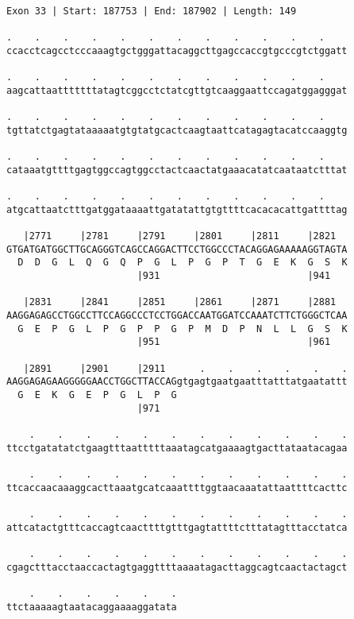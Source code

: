 \documentclass{article}
\begin{document}
\begin{Verbatim}[fontfamily=courier]
Exon 33 | Start: 187753 | End: 187902 | Length: 149

.    .    .    .    .    .    .    .    .    .    .    .    
ccacctcagcctcccaaagtgctgggattacaggcttgagccaccgtgcccgtctggatt

.    .    .    .    .    .    .    .    .    .    .    .    
aagcattaatttttttatagtcggcctctatcgttgtcaaggaattccagatggagggat

.    .    .    .    .    .    .    .    .    .    .    .    
tgttatctgagtataaaaatgtgtatgcactcaagtaattcatagagtacatccaaggtg

.    .    .    .    .    .    .    .    .    .    .    .    
cataaatgttttgagtggccagtggcctactcaactatgaaacatatcaataatctttat

.    .    .    .    .    .    .    .    .    .    .    .    
atgcattaatctttgatggataaaattgatatattgtgttttcacacacattgattttag

   |2771     |2781     |2791     |2801     |2811     |2821  
GTGATGATGGCTTGCAGGGTCAGCCAGGACTTCCTGGCCCTACAGGAGAAAAAGGTAGTA
  D  D  G  L  Q  G  Q  P  G  L  P  G  P  T  G  E  K  G  S  K
                       |931                          |941   

   |2831     |2841     |2851     |2861     |2871     |2881  
AAGGAGAGCCTGGCCTTCCAGGCCCTCCTGGACCAATGGATCCAAATCTTCTGGGCTCAA
  G  E  P  G  L  P  G  P  P  G  P  M  D  P  N  L  L  G  S  K
                       |951                          |961   

   |2891     |2901     |2911      .    .    .    .    .    .
AAGGAGAGAAGGGGGAACCTGGCTTACCAGgtgagtgaatgaatttatttatgaatattt
  G  E  K  G  E  P  G  L  P  G                              
                       |971                                 

    .    .    .    .    .    .    .    .    .    .    .    .
ttcctgatatatctgaagtttaatttttaaatagcatgaaaagtgacttataatacagaa

    .    .    .    .    .    .    .    .    .    .    .    .
ttcaccaacaaaggcacttaaatgcatcaaattttggtaacaaatattaattttcacttc

    .    .    .    .    .    .    .    .    .    .    .    .
attcatactgtttcaccagtcaacttttgtttgagtattttctttatagtttacctatca

    .    .    .    .    .    .    .    .    .    .    .    .
cgagctttacctaaccactagtgaggttttaaaatagacttaggcagtcaactactagct

    .    .    .    .    .    .
ttctaaaaagtaatacaggaaaaggatata
\end{Verbatim}
\end{document}
